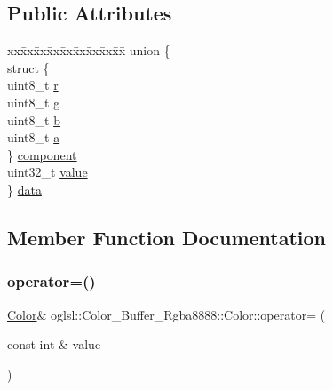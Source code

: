 \subsection*{Public Attributes}
\begin{DoxyCompactItemize}
\item 
\begin{tabbing}
xx\=xx\=xx\=xx\=xx\=xx\=xx\=xx\=xx\=\kill
union \{\\
\>struct \{\\
\>\>uint8\_t \mbox{\hyperlink{structoglsl_1_1_color___buffer___rgba8888_1_1_color_a35df3a53fbd67450bf8781d7decf25ea}{r}}\\
\>\>uint8\_t \mbox{\hyperlink{structoglsl_1_1_color___buffer___rgba8888_1_1_color_a3abc80e31a6eea04a6a82e073cf82997}{g}}\\
\>\>uint8\_t \mbox{\hyperlink{structoglsl_1_1_color___buffer___rgba8888_1_1_color_ad6bd92c117c6cf16b2508d414b3d2514}{b}}\\
\>\>uint8\_t \mbox{\hyperlink{structoglsl_1_1_color___buffer___rgba8888_1_1_color_a615d003e05e30f090ef2b5eeab8d5516}{a}}\\
\>\} \mbox{\hyperlink{structoglsl_1_1_color___buffer___rgba8888_1_1_color_af0dac5201cb5d0d0b46b534d9b511692}{component}}\\
\>uint32\_t \mbox{\hyperlink{structoglsl_1_1_color___buffer___rgba8888_1_1_color_a78e395a54038acf78582dce1c3cfb950}{value}}\\
\} \mbox{\hyperlink{structoglsl_1_1_color___buffer___rgba8888_1_1_color_ab280862451edb6b86cea7c781f8cc06b}{data}}\\

\end{tabbing}\end{DoxyCompactItemize}


\subsection{Member Function Documentation}
\mbox{\label{structoglsl_1_1_color___buffer___rgba8888_1_1_color_ac6313a1fc7e2fe36405131ef17c83866}} 
\subsubsection{\texorpdfstring{operator=()}{operator=()}}
{\footnotesize\ttfamily \mbox{\hyperlink{structoglsl_1_1_color___buffer___rgba8888_1_1_color}{Color}}\& oglsl\+::\+Color\+\_\+\+Buffer\+\_\+\+Rgba8888\+::\+Color\+::operator= (\begin{DoxyParamCaption}\item[{const int \&}]{value }\end{DoxyParamCaption})\hspace{0.3cm}{\ttfamily [inline]}}

